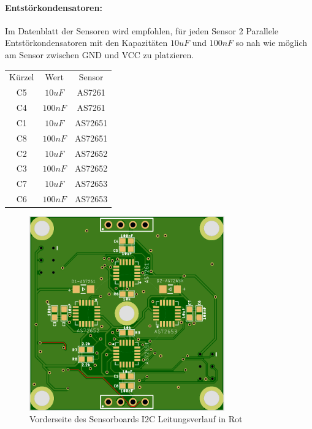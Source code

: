 \paragraph{Entstörkondensatoren:} Im Datenblatt der Sensoren wird empfohlen, für jeden Sensor 2 Parallele Entstörkondensatoren mit den Kapazitäten $10uF$ und $100nF$ so nah wie möglich am Sensor zwischen GND und VCC zu platzieren.


\begin{center}
\begin{tabular}{ c c c }
 Kürzel & Wert & Sensor \\ 
 C5 & $10uF$ & AS7261 \\  
 C4 & $100nF$ & AS7261 \\
 C1 & $10uF$ & AS72651 \\  
 C8 & $100nF$ & AS72651 \\
 C2 & $10uF$ & AS72652 \\  
 C3 & $100nF$ & AS72652 \\
 C7 & $10uF$ & AS72653 \\  
 C6 & $100nF$ & AS72653 \\
\end{tabular}
\end{center}

\begin{figure}[H]
\centering
\includegraphics[width=0.75\textwidth]{img/Sensor-platiene_front}
\caption{Vorderseite des Sensorboards I2C Leitungsverlauf in Rot}
\label{fig:Sensor-platiene_front}
\end{figure}

